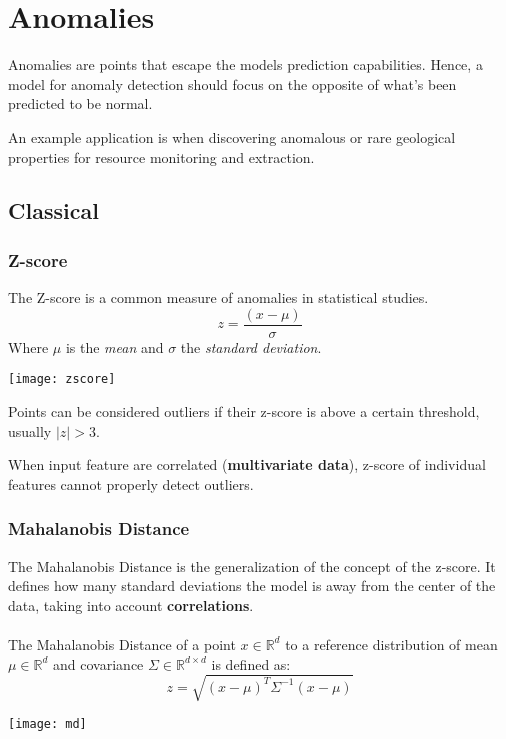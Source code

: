 \newpage
\section{Anomalies}
Anomalies are points that escape the models prediction capabilities. Hence, a model for anomaly detection should focus on the opposite of what's been predicted to be normal.

\begin{example}
	An example application is when discovering anomalous or rare geological properties for resource monitoring and extraction.
\end{example}

\subsection{Classical}
\subsubsection{Z-score}
The Z-score is a common measure of anomalies in statistical studies.
\begin{equation}
	z = \frac{(x - \mu)}{\sigma}
\end{equation}
Where $\mu$ is the \textit{mean} and $\sigma$ the \textit{standard deviation}.
\begin{center}
	\texttt{[image: zscore]}
\end{center}
Points can be considered outliers if their z-score is above a certain threshold, usually $\lvert z \rvert > 3$.

\begin{observation}
	When input feature are correlated (\textbf{multivariate data}), z-score of individual features cannot properly detect outliers.
\end{observation}

\subsubsection{Mahalanobis Distance}
The Mahalanobis Distance is the generalization of the concept of the z-score. It defines how many standard deviations the model is away from the center of the data, taking into account \textbf{correlations}. \\\\
The Mahalanobis Distance of a point $x \in \mathbb{R}^d$ to a reference distribution of mean $\mu \in \mathbb{R}^d$ and covariance $\Sigma\in \mathbb{R}^{d\times d}$ is defined as:
\begin{equation}
	z=\sqrt{(x-\mu)^T \Sigma^{-1}(x-\mu)}
\end{equation}
\begin{center}
	\texttt{[image: md]}
\end{center}

